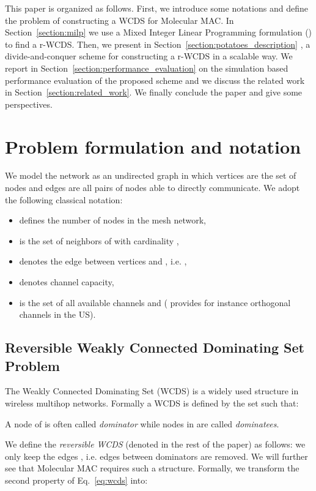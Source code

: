 \documentclass[twoside]{article}
\begin{document}
This paper is organized as follows. First, we introduce some notations
and define the problem of constructing a WCDS for Molecular MAC. In
Section~\ref{section:milp} we use a Mixed Integer Linear
Programming formulation (\milp) to find a r-WCDS. Then, we present in
Section~\ref{section:potatoes_description} \potatoes, a
divide-and-conquer scheme for constructing a r-WCDS in a scalable
way. We report in Section~\ref{section:performance_evaluation} on the
simulation based performance evaluation of the proposed scheme and
we discuss the related work in Section~\ref{section:related_work}. We
finally conclude the paper and give some perspectives.





\section{Problem formulation and notation}
\label{section:problem_formulation}

We model the network as an undirected graph  in which vertices
 are the set of nodes and edges  are all pairs of nodes
able to directly communicate. We adopt the following classical
notation:
\begin{itemize}
	\item  defines the number of nodes in the mesh network,
	\item  is the set of neighbors of  with
          cardinality ,
	\item  denotes the edge between vertices  and , i.e. ,
	\item  denotes channel capacity,
	\item  is the set of all available channels and  ( provides for instance  orthogonal
          channels in the US).
\end{itemize}


\subsection{Reversible Weakly Connected Dominating Set Problem}

The Weakly Connected Dominating Set (WCDS) \cite{dunbar97} is a widely
used structure in wireless multihop networks.
Formally a WCDS is defined by the set  such that:
\setlength{\arraycolsep}{0.0em}

A node of  is often called \emph{dominator} while nodes in  
are called \emph{dominatees}. 

We define the \emph{reversible WCDS} (denoted \rwcds in the rest of the paper) as follows: we only keep the
edges , i.e. edges between dominators are
removed. We will further see that Molecular MAC requires such a
structure. Formally, we transform the second property of
Eq.~\ref{eq:wcds} into:
\end{document}
